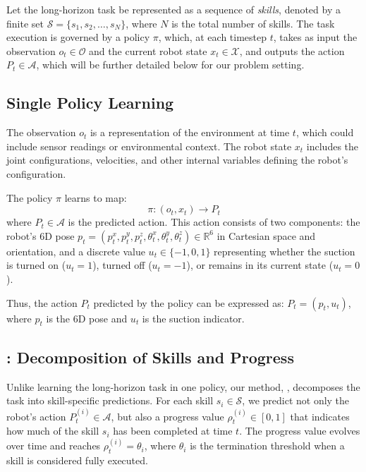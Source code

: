 Let the long-horizon task be represented as a sequence of \emph{skills}, denoted by a finite set \( \mathcal{S} = \{s_1, s_2, \dots, s_N\} \), where \( N \) is the total number of skills. The task execution is governed by a policy \( \pi \), which, at each timestep \( t \), takes as input the observation \( o_t \in \mathcal{O} \) and the current robot state \( x_t \in \mathcal{X} \), and outputs the action \( P_t \in \mathcal{A} \), which will be further detailed below for our problem setting.

\subsection{Single Policy Learning}

The observation \( o_t \) is a representation of the environment at time \( t \), which could include sensor readings or environmental context. The robot state \( x_t \) includes the joint configurations, velocities, and other internal variables defining the robot's configuration.

The policy \( \pi \) learns to map:
\[
\pi : (o_t, x_t) \to P_t
\]
where \( P_t \in \mathcal{A} \) is the predicted action. This action consists of two components: the robot’s 6D pose \( p_t = (p_t^x, p_t^y, p_t^z, \theta_t^x, \theta_t^y, \theta_t^z) \in \mathbb{R}^6 \) in Cartesian space and orientation, and a discrete value \( u_t \in \{-1, 0 , 1\} \) representing whether the suction is turned on (\( u_t = 1 \)), turned off (\( u_t = -1 \)), or remains in its current state (\( u_t = 0 \)).

Thus, the action \( P_t \) predicted by the policy can be expressed as:
$P_t = (p_t, u_t)$, 
where \( p_t \) is the 6D pose and \( u_t \) is the suction indicator.

\subsection{\ours: Decomposition of Skills and Progress}

Unlike learning the long-horizon task in one policy, our method, \ours, decomposes the task into skill-specific predictions. For each skill \( s_i \in \mathcal{S} \), we predict not only the robot’s action \( P_t^{(i)} \in \mathcal{A} \), but also a progress value \( \rho_t^{(i)} \in [0, 1] \) that indicates how much of the skill \( s_i \) has been completed at time \( t \). The progress value evolves over time and reaches \( \rho_t^{(i)} = \theta_i \), where \( \theta_i \) is the termination threshold when a skill is considered fully executed.

